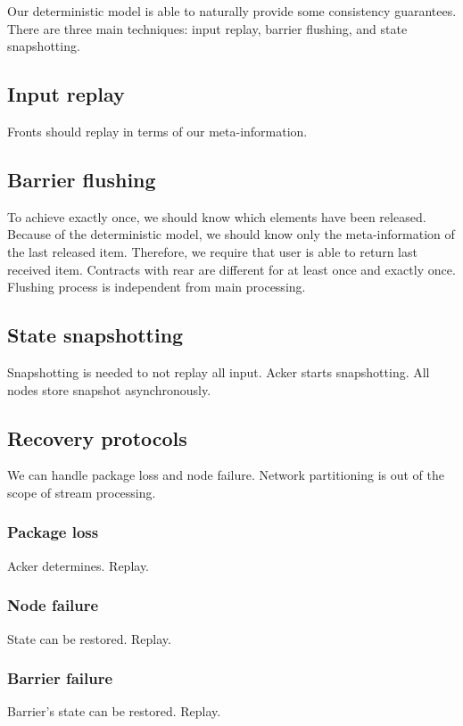 
\label {fs-consistency-seciton}

Our deterministic model is able to naturally provide some consistency guarantees. There are three main techniques: input replay, barrier flushing, and state snapshotting.

\subsection{Input replay}
Fronts should replay in terms of our meta-information.

\subsection{Barrier flushing}
To achieve exactly once, we should know which elements have been released. Because of the deterministic model, we should know only the meta-information of the last released item. Therefore, we require that user is able to return last received item. Contracts with rear are different for at least once and exactly once. Flushing process is independent from main processing.

\subsection{State snapshotting}
Snapshotting is needed to not replay all input. Acker starts snapshotting. All nodes store snapshot asynchronously.

\subsection{Recovery protocols}
We can handle package loss and node failure. Network partitioning is out of the scope of stream processing.

\subsubsection{Package loss}
Acker determines. Replay.

\subsubsection{Node failure}
State can be restored. Replay.

\subsubsection{Barrier failure}
Barrier's state can be restored. Replay.